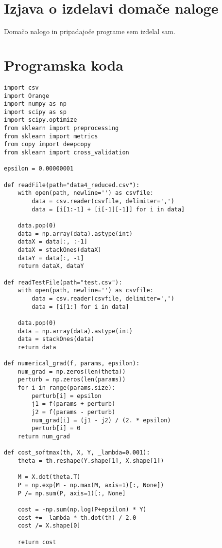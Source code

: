 \documentclass[a4paper,11pt]{article}
\begin{document}
\section{Izjava o izdelavi domače naloge}
Domačo nalogo in pripadajoče programe sem izdelal sam.

\appendix
\appendixpage

\section{\label{app-code}Programska koda}

\begin{lstlisting}
import csv
import Orange
import numpy as np
import scipy as sp
import scipy.optimize
from sklearn import preprocessing
from sklearn import metrics
from copy import deepcopy
from sklearn import cross_validation

epsilon = 0.00000001

def readFile(path="data4_reduced.csv"):
    with open(path, newline='') as csvfile:
        data = csv.reader(csvfile, delimiter=',')
        data = [i[1:-1] + [i[-1][-1]] for i in data]

    data.pop(0)
    data = np.array(data).astype(int)
    dataX = data[:, :-1]
    dataX = stackOnes(dataX)
    dataY = data[:, -1]
    return dataX, dataY

def readTestFile(path="test.csv"):
    with open(path, newline='') as csvfile:
        data = csv.reader(csvfile, delimiter=',')
        data = [i[1:] for i in data]

    data.pop(0)
    data = np.array(data).astype(int)
    data = stackOnes(data)
    return data

def numerical_grad(f, params, epsilon):
    num_grad = np.zeros(len(theta))
    perturb = np.zeros(len(params))
    for i in range(params.size):
        perturb[i] = epsilon
        j1 = f(params + perturb)
        j2 = f(params - perturb)
        num_grad[i] = (j1 - j2) / (2. * epsilon)
        perturb[i] = 0
    return num_grad

def cost_softmax(th, X, Y, _lambda=0.001):
    theta = th.reshape(Y.shape[1], X.shape[1])

    M = X.dot(theta.T)
    P = np.exp(M - np.max(M, axis=1)[:, None])
    P /= np.sum(P, axis=1)[:, None]

    cost = -np.sum(np.log(P+epsilon) * Y)
    cost += _lambda * th.dot(th) / 2.0
    cost /= X.shape[0]

    return cost


\end{lstlisting}
\end{document}
